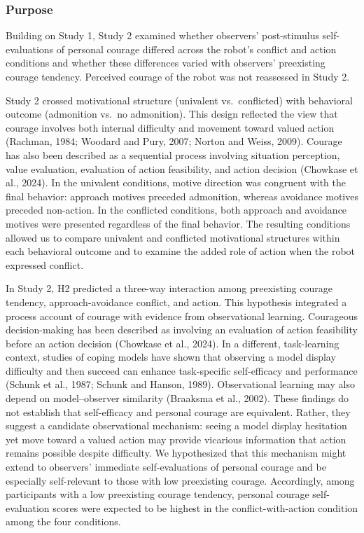 \documentclass[
]{article}
\begin{document}
\subsubsection{Purpose}\label{purpose-1}

Building on Study 1, Study 2 examined whether observers' post-stimulus
self-evaluations of personal courage differed across the robot's
conflict and action conditions and whether these differences varied with
observers' preexisting courage tendency. Perceived courage of the robot
was not reassessed in Study 2.

Study 2 crossed motivational structure (univalent vs.~conflicted) with
behavioral outcome (admonition vs.~no admonition). This design reflected
the view that courage involves both internal difficulty and movement
toward valued action (Rachman, 1984; Woodard and Pury, 2007; Norton and
Weiss, 2009). Courage has also been described as a sequential process
involving situation perception, value evaluation, evaluation of action
feasibility, and action decision (Chowkase et al., 2024). In the
univalent conditions, motive direction was congruent with the final
behavior: approach motives preceded admonition, whereas avoidance
motives preceded non-action. In the conflicted conditions, both approach
and avoidance motives were presented regardless of the final behavior.
The resulting conditions allowed us to compare univalent and conflicted
motivational structures within each behavioral outcome and to examine
the added role of action when the robot expressed conflict.

In Study 2, H2 predicted a three-way interaction among preexisting
courage tendency, approach-avoidance conflict, and action. This
hypothesis integrated a process account of courage with evidence from
observational learning. Courageous decision-making has been described as
involving an evaluation of action feasibility before an action decision
(Chowkase et al., 2024). In a different, task-learning context, studies
of coping models have shown that observing a model display difficulty
and then succeed can enhance task-specific self-efficacy and performance
(Schunk et al., 1987; Schunk and Hanson, 1989). Observational learning
may also depend on model--observer similarity (Braaksma et al., 2002).
These findings do not establish that self-efficacy and personal courage
are equivalent. Rather, they suggest a candidate observational
mechanism: seeing a model display hesitation yet move toward a valued
action may provide vicarious information that action remains possible
despite difficulty. We hypothesized that this mechanism might extend to
observers' immediate self-evaluations of personal courage and be
especially self-relevant to those with low preexisting courage.
Accordingly, among participants with a low preexisting courage tendency,
personal courage self-evaluation scores were expected to be highest in
the conflict-with-action condition among the four conditions.
\end{document}
